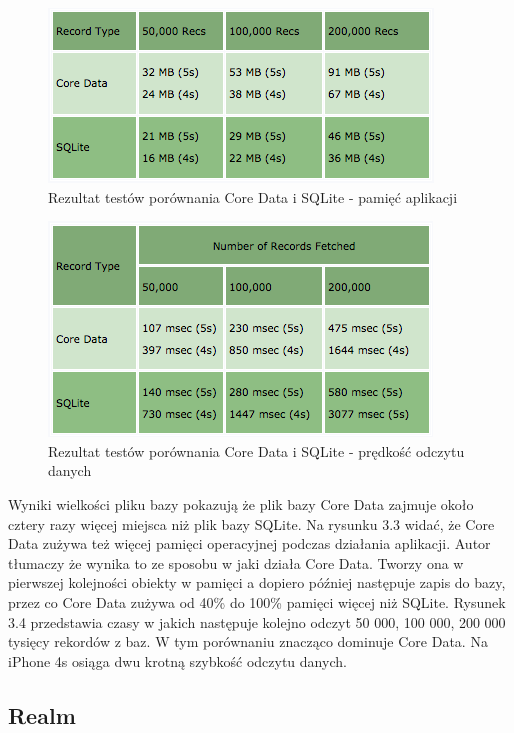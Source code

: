 \begin{figure}
\centering
	\includegraphics{img/drdobbs_memory_test.png}
	\caption{Rezultat testów porównania Core Data i SQLite - pamięć aplikacji}
	\label{fig: CoreData_SQLite_memory_test}
\end{figure}

\begin{figure}
\centering
	\includegraphics{img/drdobbs_speed_test.png}
	\caption{Rezultat testów porównania Core Data i SQLite - prędkość odczytu danych}
	\label{fig: CoreData_SQLite_speed_test}
\end{figure}
\clearpage

Wyniki wielkości pliku bazy pokazują że plik bazy Core Data zajmuje około cztery razy więcej miejsca niż plik bazy SQLite. Na rysunku 3.3 widać, że Core Data zużywa też więcej pamięci operacyjnej podczas działania aplikacji. Autor tłumaczy że wynika to ze sposobu w jaki działa Core Data. Tworzy ona w pierwszej kolejności obiekty w pamięci a dopiero później następuje zapis do bazy, przez co Core Data zużywa od 40\% do 100\% pamięci więcej niż SQLite. Rysunek 3.4 przedstawia czasy w jakich następuje kolejno odczyt 50 000, 100 000, 200 000 tysięcy rekordów z baz. W tym porównaniu znacząco dominuje Core Data. Na iPhone 4s osiąga dwu krotną szybkość odczytu danych. 

\subsection{Realm}

